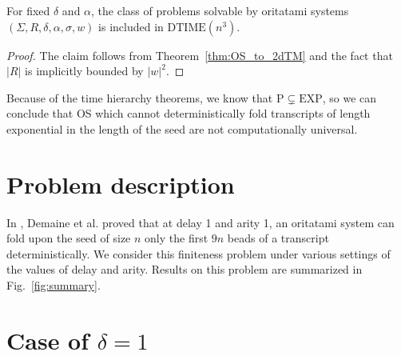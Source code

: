 \documentclass[runningheads]{llncs}
\begin{document}
\begin{corollary}
	For fixed $\delta$ and $\alpha$, the class of problems solvable by oritatami systems $(\Sigma, R, \delta, \alpha, \sigma, w)$ is included in $\mathrm{DTIME}(n^3)$.
\end{corollary}
\begin{proof}
	The claim follows from Theorem~\ref{thm:OS_to_2dTM} and the fact that $|R|$ is implicitly bounded by $|w|^2$.
\end{proof}



Because of the time hierarchy theorems, we know that $\mathrm{P}\subsetneq \mathrm{EXP}$, so we can conclude that OS which cannot deterministically fold transcripts of length exponential in the length of the seed are not computationally universal.

\section{Problem description}

In \cite{DemaineDNA24}, Demaine et al. proved that at delay 1 and arity 1, an oritatami system can fold upon the seed of size $n$ only the first $9n$ beads of a transcript deterministically. 
We consider this finiteness problem under various settings of the values of delay and arity. 
Results on this problem are summarized in Fig.~\ref{fig:summary}. 



\section{Case of $\delta = 1$}



\end{document}
